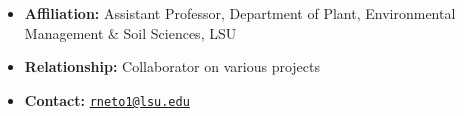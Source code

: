 \documentclass[11pt,a4paper,]{moderncv}
\providecommand{\tightlist}{%
	\setlength{\itemsep}{0pt}\setlength{\parskip}{0pt}}
\begin{document}
\begin{itemize}
  \begin{itemize}
  \tightlist
  \item
    \textbf{Affiliation:} Assistant Professor, Department of Plant,
    Environmental Management \& Soil Sciences, LSU
  \item
    \textbf{Relationship:} Collaborator on various projects
  \item
    \textbf{Contact:}
    \href{mailto:rneto1@lsu.edu}{\nolinkurl{rneto1@lsu.edu}}
  \end{itemize}
\end{itemize}
\end{document}
